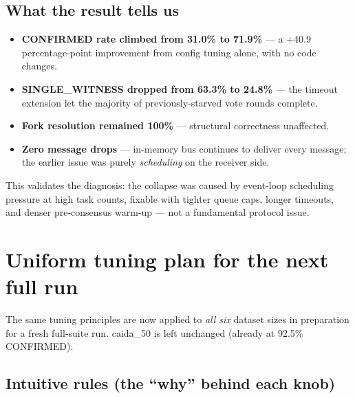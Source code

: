 \documentclass[10pt,a4paper]{article}
\begin{document}
\subsection*{What the result tells us}

\begin{itemize}
\item \textbf{CONFIRMED rate climbed from 31.0\% to 71.9\%} --- a
  $+40.9$ percentage-point improvement from config tuning alone, with
  no code changes.
\item \textbf{SINGLE\_WITNESS dropped from 63.3\% to 24.8\%} --- the
  timeout extension let the majority of previously-starved vote rounds
  complete.
\item \textbf{Fork resolution remained 100\%} --- structural correctness
  unaffected.
\item \textbf{Zero message drops} --- in-memory bus continues to deliver
  every message; the earlier issue was purely \emph{scheduling} on the
  receiver side.
\end{itemize}

This validates the diagnosis: the collapse was caused by event-loop
scheduling pressure at high task counts, fixable with tighter queue
caps, longer timeouts, and denser pre-consensus warm-up --- not a
fundamental protocol issue.

\section{Uniform tuning plan for the next full run}

The same tuning principles are now applied to \emph{all six} dataset
sizes in preparation for a fresh full-suite run.  caida\_50 is left
unchanged (already at 92.5\% CONFIRMED).

\subsection*{Intuitive rules (the ``why'' behind each knob)}
\end{document}

